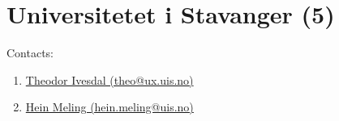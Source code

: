 \section{Universitetet i Stavanger (5)}
\label{sec:UiS}

Contacts:\begin{enumerate}
 \item {}\href{mailto:theo@ux.uis.no}{Theodor Ivesdal (theo@ux.uis.no)}
 \item {}\href{mailto:hein.meling@uis.no}{Hein Meling (hein.meling@uis.no)}
\end{enumerate}

